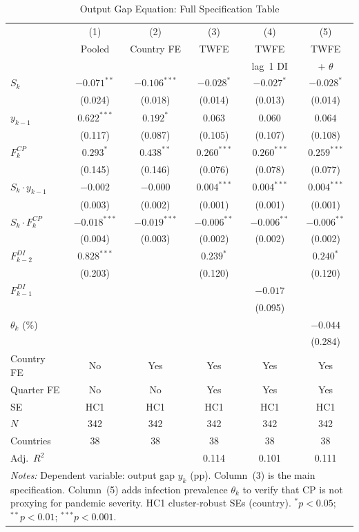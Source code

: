 \documentclass[12pt, a4paper]{article}
\begin{document}
\begin{table}[htbp]
\centering
\caption{Output Gap Equation: Full Specification Table}
\label{tab:output_full}
\small
\begin{tabular}{lccccc}
\toprule
 & (1) & (2) & (3) & (4) & (5) \\
 & Pooled & Country FE & TWFE & TWFE & TWFE \\
 &        &            &      & lag~1 DI & + $\theta$ \\
\midrule
$S_k$
  & $-0.071^{**}$ & $-0.106^{***}$ & $-0.028^{*}$ & $-0.027^{*}$ & $-0.028^{*}$ \\
  & (0.024)       & (0.018)        & (0.014)      & (0.013)      & (0.014)      \\[3pt]
$y_{k-1}$
  & $0.622^{***}$ & $0.192^{*}$ & $0.063$ & $0.060$ & $0.064$ \\
  & (0.117)       & (0.087)     & (0.105) & (0.107) & (0.108) \\[3pt]
$F_k^{CP}$
  & $0.293^{*}$ & $0.438^{**}$ & $0.260^{***}$ & $0.260^{***}$ & $0.259^{***}$ \\
  & (0.145)     & (0.146)      & (0.076)       & (0.078)       & (0.077)       \\[3pt]
$S_k \cdot y_{k-1}$
  & $-0.002$ & $-0.000$ & $0.004^{***}$ & $0.004^{***}$ & $0.004^{***}$ \\
  & (0.003)  & (0.002)  & (0.001)       & (0.001)       & (0.001)       \\[3pt]
$S_k \cdot F_k^{CP}$
  & $-0.018^{***}$ & $-0.019^{***}$ & $-0.006^{**}$ & $-0.006^{**}$ & $-0.006^{**}$ \\
  & (0.004)        & (0.003)        & (0.002)       & (0.002)       & (0.002)       \\[3pt]
$F_{k-2}^{DI}$
  & $0.828^{***}$ &  & $0.239^{*}$ &  & $0.240^{*}$ \\
  & (0.203)       &  & (0.120)     &  & (0.120)     \\[3pt]
$F_{k-1}^{DI}$
  &  &  &  & $-0.017$ & \\
  &  &  &  & (0.095)  & \\[3pt]
$\theta_k$ (\%)
  &  &  &  &  & $-0.044$ \\
  &  &  &  &  & (0.284)  \\[3pt]
\midrule
Country FE & No & Yes & Yes & Yes & Yes \\
Quarter FE & No & No  & Yes & Yes & Yes \\
SE         & HC1 & HC1 & HC1 & HC1 & HC1 \\
$N$        & 342 & 342 & 342 & 342 & 342 \\
Countries  & 38 & 38 & 38 & 38 & 38 \\
Adj.~$R^2$ &  &  & 0.114 & 0.101 & 0.111 \\
\bottomrule
\multicolumn{6}{p{13cm}}{\footnotesize \textit{Notes:} Dependent variable: output gap $y_k$ (pp). Column~(3) is the main specification. Column~(5) adds infection prevalence $\theta_k$ to verify that CP is not proxying for pandemic severity. HC1 cluster-robust SEs (country). $^{*}p<0.05$; $^{**}p<0.01$; $^{***}p<0.001$.} \\
\end{tabular}
\end{table}
\end{document}
